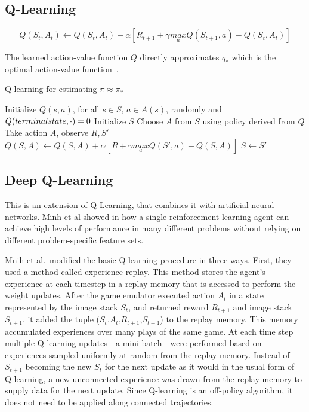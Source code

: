 \documentclass[letterpaper, 10 pt]{IEEEconf}
\begin{document}
\subsection{Q-Learning}


$$
Q (S_t, A_t) \leftarrow Q(S_t, A_t) + \alpha \left[ R_{t+1} + \gamma \underset{a}{max} Q(S_{t+1}, a) - Q(S_t, A_t) \right]
$$

The learned action-value function $Q$ directly approximates $q_*$
which is the optimal action-value function~\cite{sutton2018reinforcement}.


\begin{algorithm}
\caption{Q-learning for estimating $\pi \approx \pi_*$}
\begin{algorithmic}[1]
    \State Initialize $Q(s, a)$, for all $s \in \mathit{S}$, $a \in \mathit{A}(s)$, randomly and $Q(terminal\-state, \cdot)=0$
    \State Initialize $S$
    \State Choose $A$ from $S$ using policy derived from $Q$
    \State Take action $A$, observe $R, S'$
    \State $Q (S, A) \leftarrow Q(S, A) + \alpha \left[ R + \gamma \underset{a}{max} Q(S', a) - Q(S, A) \right]$
    \State $S \leftarrow S'$
    \EndIf
    \EndIf
\end{algorithmic}
\end{algorithm}


\subsection{Deep Q-Learning}

This is an extension of Q-Learning, that combines it with artificial
neural networks. Minh et al showed in \cite{minh_dqn} how a single
reinforcement learning agent can achieve high levels of performance in
many different problems without relying on different problem-specific
feature sets.

Mnih et al.\ modified the basic Q-learning procedure in three
ways. First, they used a method called experience replay. This method
stores the agent’s experience at each timestep in a replay memory that
is accessed to perform the weight updates. After the game emulator
executed action $A_t$ in a state represented by the image stack $S_t$,
and returned reward $R_{t+1}$ and image stack $S_{t+1}$, it added the
tuple ($S_t$,$A_t$,$R_{t+1}$,$S_{t+1}$) to the replay memory. This
memory accumulated experiences over many plays of the same game. At
each time step multiple Q-learning updates—a mini-batch—were performed
based on experiences sampled uniformly at random from the replay
memory. Instead of $S_{t+1}$ becoming the new $S_t$ for the next
update as it would in the usual form of Q-learning, a new unconnected
experience was drawn from the replay memory to supply data for the
next update. Since Q-learning is an off-policy algorithm, it does not
need to be applied along connected trajectories.
\end{document}
